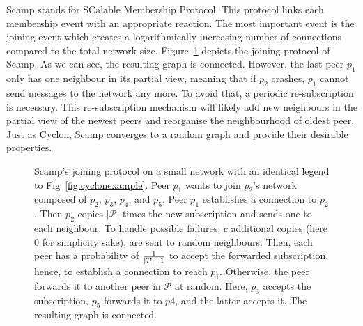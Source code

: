 \begin{asparadesc}
\item [Scamp]\cite{ganesh2001scamp,ganesh2003peer} stands for SCalable
  Membership Protocol. This protocol links each membership event with an
  appropriate reaction.  The most important event is the joining event which
  creates a logarithmically increasing number of connections compared to the
  total network size.  Figure~\ref{fig:scampexample} depicts the joining
  protocol of Scamp. As we can see, the resulting graph is connected. However,
  the last peer $p_1$ only has one neighbour in its partial view, meaning that
  if $p_2$ crashes, $p_1$ cannot send messages to the network any more. To
  avoid that, a periodic re-subscription is necessary. This re-subscription
  mechanism will likely add new neighbours in the partial view of the newest
  peers and reorganise the neighbourhood of oldest peer. Just as Cyclon, Scamp
  converges to a random graph and provide their desirable properties.
\end{asparadesc}

\begin{figure}
  \centering
  
  \caption{\label{fig:scampexample} Scamp's joining protocol on a small network
    with an identical legend to Fig~\ref{fig:cyclonexample}. Peer $p_1$ wants
    to join $p_2$'s network composed of $p_2$, $p_3$, $p_4$, and $p_5$. Peer
    $p_1$ establishes a connection to $p_2$. Then $p_2$ copies
    $|\mathcal{P}|$-times the new subscription and sends one to each
    neighbour. To handle possible failures, $c$ additional copies (here $0$ for
    simplicity sake), are sent to random neighbours. Then, each peer has a
    probability of $1\over{|\mathcal{P}|+1}$ to accept the forwarded
    subscription, hence, to establish a connection to reach $p_1$. Otherwise,
    the peer forwards it to another peer in $\mathcal{P}$ at random. Here,
    $p_3$ accepts the subscription, $p_5$ forwards it to $p4$, and the latter
    accepts it. The resulting graph is connected.}
\end{figure}


